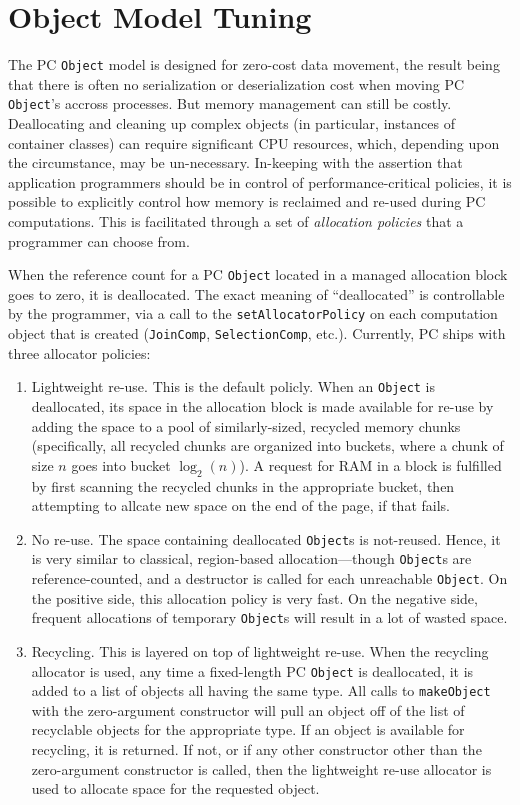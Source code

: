 \section{Object Model Tuning}

\noindent
The PC \texttt{Object} model is designed for zero-cost data movement, the result being that there is often no serialization or deserialization
cost
when moving PC \texttt{Object}'s accross processes.  But memory management can still be costly.  Deallocating and cleaning
up complex objects (in particular, instances of container classes) can require significant CPU resources, which, depending upon the 
circumstance, may be un-necessary.  In-keeping with the assertion that application programmers should be in
control of performance-critical policies, it is possible to explicitly control how memory is reclaimed and re-used during PC computations.
This is facilitated through a set of \emph{allocation policies} that a programmer can choose from.

When the reference count for a PC \texttt{Object} located in a managed allocation block goes to zero, it is deallocated.  The exact
meaning of ``deallocated'' is controllable by the programmer, via a call to the \texttt{setAllocatorPolicy} on each computation object
that is created (\texttt{JoinComp}, \texttt{SelectionComp}, etc.).  Currently, PC ships with
three allocator policies:

\begin{enumerate}

\item Lightweight re-use.  This is the default policly.  When an \texttt{Object} is deallocated, its space in the allocation block is made available for re-use by
adding the space to a pool of similarly-sized, recycled memory chunks (specifically, all recycled chunks are organized into buckets, where a chunk of size
$n$ goes into bucket $\log_2 (n)$).  A request for RAM in a block is fulfilled by first scanning the recycled chunks in the appropriate bucket, then
attempting to allcate new space on the end of the page, if that fails.
\item No re-use.  The space containing deallocated \texttt{Object}s is not-reused.  Hence, it is very similar to classical, region-based allocation---though \texttt{Object}s
are reference-counted, and a destructor is called for each unreachable \texttt{Object}.
On the positive side, this allocation policy is very fast.  On the negative side, frequent allocations of temporary \texttt{Object}s will result in a lot of wasted space.
\item Recycling.  This is layered on top of lightweight re-use.  When the recycling allocator is used, any time a fixed-length
PC \texttt{Object} is deallocated, it is
added to a list of objects all having the same type.  All calls to \texttt{makeObject} with the zero-argument constructor will
pull an object off of the list of recyclable objects for the appropriate type.  
If an object is available for recycling, it is returned.  If not, or if any other constructor other than the zero-argument constructor is called, 
then the lightweight re-use allocator is used to allocate space for the requested
object.

\end{enumerate}

